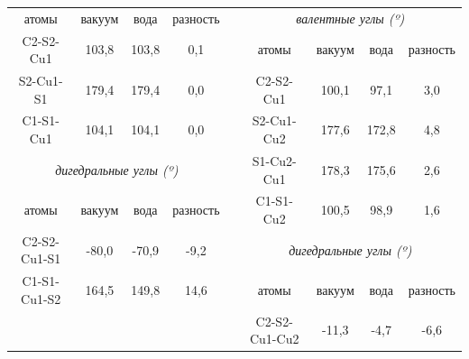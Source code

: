 \documentclass[a4paper,12pt]{article}
\begin{document}
\begin{onehalfspace}
\begin{table}[H]
\begin{tabular}{ccccc|cccc|}
			\multicolumn{1}{|c|}{атомы}        & \multicolumn{1}{c|}{вакуум} & \multicolumn{1}{c|}{вода}  & \multicolumn{1}{c|}{разность} &           & \multicolumn{4}{c|}{\textit{валентные углы (º)}}                                                         \\ \cline{1-4} \cline{6-9} 
			\multicolumn{1}{|c|}{C2-S2-Cu1}    & \multicolumn{1}{c|}{103,8}  & \multicolumn{1}{c|}{103,8} & \multicolumn{1}{c|}{0,1}      &           & \multicolumn{1}{c|}{атомы}         & \multicolumn{1}{c|}{вакуум} & \multicolumn{1}{c|}{вода}  & разность \\ \cline{1-4} \cline{6-9} 
			\multicolumn{1}{|c|}{S2-Cu1-S1}    & \multicolumn{1}{c|}{179,4}  & \multicolumn{1}{c|}{179,4} & \multicolumn{1}{c|}{0,0}      &           & \multicolumn{1}{c|}{C2-S2-Cu1}     & \multicolumn{1}{c|}{100,1}  & \multicolumn{1}{c|}{97,1}  & 3,0      \\ \cline{1-4} \cline{6-9} 
			\multicolumn{1}{|c|}{C1-S1-Cu1}    & \multicolumn{1}{c|}{104,1}  & \multicolumn{1}{c|}{104,1} & \multicolumn{1}{c|}{0,0}      &           & \multicolumn{1}{c|}{S2-Cu1-Cu2}    & \multicolumn{1}{c|}{177,6}  & \multicolumn{1}{c|}{172,8} & 4,8      \\ \cline{1-4} \cline{6-9} 
			\multicolumn{4}{|c|}{\textit{дигедральные углы   (º)}}                                                                        & \textit{} & \multicolumn{1}{c|}{S1-Cu2-Cu1}    & \multicolumn{1}{c|}{178,3}  & \multicolumn{1}{c|}{175,6} & 2,6      \\ \cline{1-4} \cline{6-9} 
			\multicolumn{1}{|c|}{атомы}        & \multicolumn{1}{c|}{вакуум} & \multicolumn{1}{c|}{вода}  & \multicolumn{1}{c|}{разность} &           & \multicolumn{1}{c|}{C1-S1-Cu2}     & \multicolumn{1}{c|}{100,5}  & \multicolumn{1}{c|}{98,9}  & 1,6      \\ \cline{1-4} \cline{6-9} 
			\multicolumn{1}{|c|}{C2-S2-Cu1-S1} & \multicolumn{1}{c|}{-80,0}  & \multicolumn{1}{c|}{-70,9} & \multicolumn{1}{c|}{-9,2}     &           & \multicolumn{4}{c|}{\textit{дигедральные углы (º)}}                                                      \\ \cline{1-4} \cline{6-9} 
			\multicolumn{1}{|c|}{C1-S1-Cu1-S2} & \multicolumn{1}{c|}{164,5}  & \multicolumn{1}{c|}{149,8} & \multicolumn{1}{c|}{14,6}     &           & \multicolumn{1}{c|}{атомы}         & \multicolumn{1}{c|}{вакуум} & \multicolumn{1}{c|}{вода}  & разность \\ \cline{1-4} \cline{6-9} 
			&                             &                            &                               &           & \multicolumn{1}{c|}{C2-S2-Cu1-Cu2} & \multicolumn{1}{c|}{-11,3}  & \multicolumn{1}{c|}{-4,7}  & -6,6     \\ \cline{6-9} 

\end{tabular}
\end{table}
\end{onehalfspace}
\end{document}
